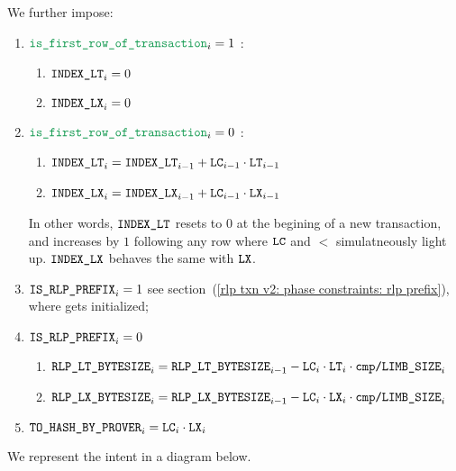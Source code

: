 
\noindent We further impose:
\begin{enumerate}
    \item \If $\locIsFirstRowOfTransaction _{i} = 1$ \Then:
        \begin{enumerate}
            \item $\texttt{INDEX\_LT} _{i} = 0$
            \item $\texttt{INDEX\_LX} _{i} = 0$
        \end{enumerate}
    \item \If $\locIsFirstRowOfTransaction _{i} = 0$ \Then:
        \begin{enumerate}
            \item $\texttt{INDEX\_LT} _{i} = \texttt{INDEX\_LT} _{i - 1} + \texttt{LC} _{i - 1} \cdot \texttt{LT} _{i - 1}$
            \item $\texttt{INDEX\_LX} _{i} = \texttt{INDEX\_LX} _{i - 1} + \texttt{LC} _{i - 1} \cdot \texttt{LX} _{i - 1}$
        \end{enumerate}
        \saNote{}
        In other words, $\texttt{INDEX\_LT}$ resets to $0$ at the begining of a new transaction,
        and increases by $1$ following any row where $\texttt{LC}$ and $\lt$ simulatneously light up.
        $\texttt{INDEX\_LX}$ behaves the same with $\texttt{LX}$.
    \item \If $\texttt{IS\_RLP\_PREFIX} _{i} = 1$ \Then
        see section~(\ref{rlp txn v2: phase constraints: rlp prefix}),
        where \phaseRlpPrefix{} gets initialized;
    \item \If $\texttt{IS\_RLP\_PREFIX} _{i} = 0$ \Then
        \begin{enumerate}
            \item $\texttt{RLP\_LT\_BYTESIZE} _{i} = \texttt{RLP\_LT\_BYTESIZE} _{i - 1} - \texttt{LC} _{i} \cdot \texttt{LT} _{i} \cdot\texttt{cmp}\texttt{/}\texttt{{LIMB\_SIZE}} _{i}$
            \item $\texttt{RLP\_LX\_BYTESIZE} _{i} = \texttt{RLP\_LX\_BYTESIZE} _{i - 1} - \texttt{LC} _{i} \cdot \texttt{LX} _{i} \cdot\texttt{cmp}\texttt{/}\texttt{{LIMB\_SIZE}} _{i}$
        \end{enumerate}
    \item $\texttt{TO\_HASH\_BY\_PROVER} _{i} = \texttt{LC} _{i} \cdot \texttt{LX} _{i}$
\end{enumerate}
We represent the intent in a diagram below.


